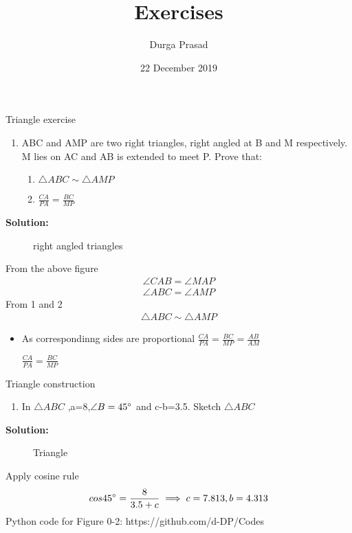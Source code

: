 \documentclass{beamer}
\title[Your Short Title]{Exercises}
\author{Durga Prasad}
\institute{}
\date{22 December 2019}
\newcounter{saveenumi}
\newcommand{\seti}{\setcounter{saveenumi}{\value{enumi}}}
\newcommand{\conti}{\setcounter{enumi}{\value{saveenumi}}}
\begin{document}
\begin{frame}
  \titlepage
\end{frame}
\begin{frame}{Triangle exercise}
\begin{enumerate}
\item ABC and AMP are two right triangles, right
angled at B and M respectively. M lies on AC
and AB is extended to meet P. Prove that:
\seti
\begin{enumerate}
\item $\triangle{ABC} \sim \triangle{AMP}$
\item $\frac{CA}{PA}=\frac{BC}{MP}$
\end{enumerate}
\end{enumerate}
\textbf{Solution:}

\begin{figure}[!ht]
\resizebox{.4\linewidth}{!}
{

}
\caption{right angled triangles}
\label{fig:foo}
\end{figure}
\end{frame}
\begin{frame}
From the above figure
\begin{align}
	\angle{CAB} =\angle{MAP} \\
	\angle{ABC} = \angle{AMP}
\end{align}
From 1 and 2
\begin{align}
\triangle{ABC} \sim \triangle{AMP}
\end{align}
\begin{itemize}
\item As correspondinng sides are proportional
$\frac{CA}{PA}=\frac{BC}{MP}=\frac{AB}{AM}$

\begin{center}
$\frac{CA}{PA}=\frac{BC}{MP}$
\end{center}
\end{itemize}
\end{frame}
\begin{frame}{Triangle construction}
\begin{enumerate}
\conti
\item In $\triangle{ABC}$ ,a=8,$\angle{B}=45\degree$ and c-b=3.5. Sketch $\triangle{ABC}$
\seti
\end{enumerate}
\textbf{Solution:}
\begin{figure}[!ht]
\resizebox{0.3\linewidth}{!}
{

}
\caption{Triangle}
\label{fig:foo}
\end{figure}
Apply cosine rule \\
\begin{align*}
	cos{45\degree}=\frac{8}{3.5+c} \implies c=7.813, b=4.313
\end{align*}
Python code for Figure 0-2: https://github.com/d-DP/Codes
\end{frame}
\end{document}
